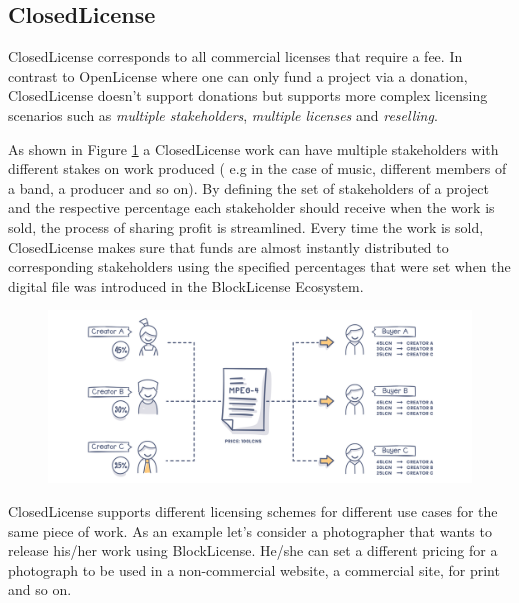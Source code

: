 
\subsection{ClosedLicense}

ClosedLicense corresponds to all commercial licenses that require a fee. In contrast to OpenLicense where one can only fund a project via a donation, ClosedLicense doesn't support donations but supports more complex licensing scenarios such as \textit{multiple stakeholders}, \textit{multiple licenses} and \textit{reselling}.

As shown in Figure \ref{fig:stakeholders} a ClosedLicense work can have multiple stakeholders with different stakes on work produced ( e.g in the case of music, different members of a band, a producer and so on). By defining the set of stakeholders of a project and the respective percentage each stakeholder should receive when the work is sold, the process of sharing profit is streamlined. Every time the work is sold, ClosedLicense makes sure that funds are almost instantly distributed to corresponding stakeholders using the specified percentages that were set when the digital file was introduced in the BlockLicense Ecosystem.

\begin{figure}[h]
\centering
\begin{minipage}{1\textwidth}
  \centering
  \includegraphics[width=1\linewidth]{./figures/fig5.png}
  \label{fig:stakeholders}
\end{minipage}
\end{figure}

ClosedLicense supports different licensing schemes for different use cases for the same piece of work. As an example let's consider a photographer that wants to release his/her work using BlockLicense. He/she can set a different pricing for a photograph to be used in a non-commercial website, a commercial site, for print and so on.

